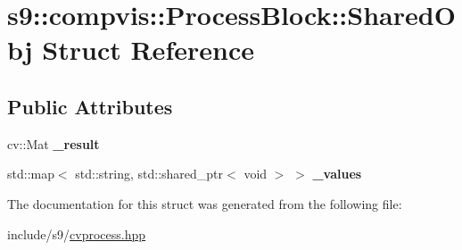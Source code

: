 \hypertarget{structs9_1_1compvis_1_1ProcessBlock_1_1SharedObj}{\section{s9\-:\-:compvis\-:\-:\-Process\-Block\-:\-:\-Shared\-Obj \-Struct \-Reference}
\label{structs9_1_1compvis_1_1ProcessBlock_1_1SharedObj}
}
\subsection*{\-Public \-Attributes}
\begin{DoxyCompactItemize}
\item 
\hypertarget{structs9_1_1compvis_1_1ProcessBlock_1_1SharedObj_aee9aef39ed555070c195ea8cdaa10e6e}{cv\-::\-Mat {\bfseries \-\_\-result}}\label{structs9_1_1compvis_1_1ProcessBlock_1_1SharedObj_aee9aef39ed555070c195ea8cdaa10e6e}

\item 
\hypertarget{structs9_1_1compvis_1_1ProcessBlock_1_1SharedObj_a7219cae77fd4bcc82c185fc49947a0eb}{std\-::map$<$ std\-::string, \*
std\-::shared\-\_\-ptr$<$ void $>$ $>$ {\bfseries \-\_\-values}}\label{structs9_1_1compvis_1_1ProcessBlock_1_1SharedObj_a7219cae77fd4bcc82c185fc49947a0eb}

\end{DoxyCompactItemize}


\-The documentation for this struct was generated from the following file\-:\begin{DoxyCompactItemize}
\item 
include/s9/\hyperlink{cvprocess_8hpp}{cvprocess.\-hpp}\end{DoxyCompactItemize}
